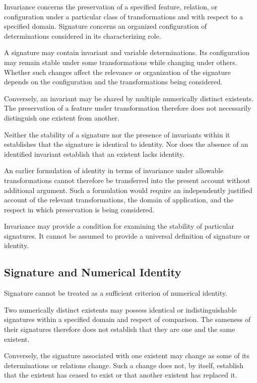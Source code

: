 Invariance concerns the preservation of a specified
feature, relation, or configuration under a particular
class of transformations and with respect to a
specified domain. Signature concerns an organized
configuration of determinations considered in its
characterizing role.

A signature may contain invariant and variable
determinations. Its configuration may remain stable
under some transformations while changing under
others. Whether such changes affect the relevance
or organization of the signature depends on the
configuration and the transformations being considered.

Conversely, an invariant may be shared by multiple
numerically distinct existents. The preservation of
a feature under transformation therefore does not
necessarily distinguish one existent from another.

Neither the stability of a signature nor the
presence of invariants within it establishes that
the signature is identical to identity. Nor does
the absence of an identified invariant establish
that an existent lacks identity.

An earlier formulation of identity in terms of
invariance under allowable transformations cannot
therefore be transferred into the present account
without additional argument. Such a formulation
would require an independently justified account
of the relevant transformations, the domain of
application, and the respect in which preservation
is being considered.

Invariance may provide a condition for examining
the stability of particular signatures. It cannot
be assumed to provide a universal definition of
signature or identity.

\subsection{Signature and Numerical Identity}

Signature cannot be treated as a sufficient criterion
of numerical identity.

Two numerically distinct existents may possess
identical or indistinguishable signatures within
a specified domain and respect of comparison.
The sameness of their signatures therefore does
not establish that they are one and the same existent.

Conversely, the signature associated with one
existent may change as some of its determinations
or relations change. Such a change does not, by
itself, establish that the existent has ceased
to exist or that another existent has replaced it.

